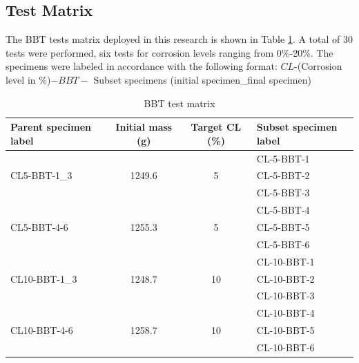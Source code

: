 \subsection{Test Matrix}
The BBT tests matrix deployed in this research is shown in Table \ref{tab:bbt_matrix}. A total of 30 tests were performed, six tests for corrosion levels ranging from 0\%-20\%. The specimens were labeled in accordance with the following format:
\newline
$CL$-(Corrosion level in  \%)$-BBT-$ Subset specimens (initial specimen\_final specimen)

\begin{table}[htbp]
\caption{BBT test matrix}
\label{tab:bbt_matrix}
\centering
\begin{tabular}{lccl}
Parent specimen label          & Initial mass (g)        & Target CL (\%)      & Subset specimen label \\ \hline
\multirow{3}{*}{CL5-BBT-1\_3}  & \multirow{3}{*}{1249.6} & \multirow{3}{*}{5}  & CL-5-BBT-1            \\
                               &                         &                     & CL-5-BBT-2            \\
                               &                         &                     & CL-5-BBT-3            \\
\multirow{3}{*}{CL5-BBT-4-6}   & \multirow{3}{*}{1255.3} & \multirow{3}{*}{5}  & CL-5-BBT-4            \\
                               &                         &                     & CL-5-BBT-5            \\
                               &                         &                     & CL-5-BBT-6            \\
\multirow{3}{*}{CL10-BBT-1\_3} & \multirow{3}{*}{1248.7} & \multirow{3}{*}{10} & CL-10-BBT-1           \\
                               &                         &                     & CL-10-BBT-2           \\
                               &                         &                     & CL-10-BBT-3           \\
\multirow{3}{*}{CL10-BBT-4-6}  & \multirow{3}{*}{1258.7} & \multirow{3}{*}{10} & CL-10-BBT-4           \\
                               &                         &                     & CL-10-BBT-5           \\
                               &                         &                     & CL-10-BBT-6           \\

\end{tabular}
\end{table}

